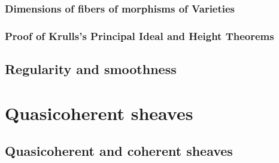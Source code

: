 \documentclass[11pt]{book} %
\begin{document}
\section{Dimensions of fibers of morphisms of Varieties}
\section{Proof of Krulls's Principal Ideal and Height Theorems}
\chapter{Regularity and smoothness}

\part{Quasicoherent sheaves}
\chapter{Quasicoherent and coherent sheaves}
\end{document}
